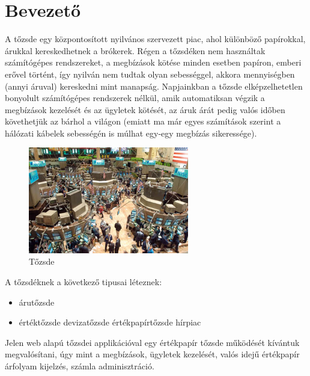 \chapter*{Bevezető}

A tőzsde egy központosított nyilvános szervezett piac, ahol különböző papírokkal, árukkal kereskedhetnek a brókerek. Régen a tőzsdéken nem használtak számítógépes rendszereket, a megbízások kötése minden esetben papíron, emberi erővel történt, így nyilván nem tudtak olyan sebességgel, akkora mennyiségben (annyi áruval) kereskedni mint manapság. Napjainkban a tőzsde elképzelhetetlen bonyolult számítógépes rendszerek nélkül, amik automatiksan végzik a megbízások kezelését és az ügyletek kötését, az áruk árát pedig valós időben követhetjük az bárhol a világon (emiatt ma már egyes számítások szerint a hálózati kábelek sebességén is múlhat egy-egy megbízás sikeressége).

\begin{figure}[!ht]
\centering
\includegraphics[width=70mm, keepaspectratio]{figures/tozsde.png}
\caption{Tőzsde}
\label{fig:kep_tozsde}
\end{figure}

A tőzsdéknek a következő tipusai léteznek:

\begin{itemize}
 \item árutőzsde
 \item értéktőzsde
 \subitem devizatőzsde
  \subitem értékpapírtőzsde
   \subitem hírpiac
\end{itemize}

Jelen web alapú tőzsdei applikációval egy értékpapír tőzsde működését kívántuk megvalósítani, úgy mint a megbízások, ügyletek kezelését, valós idejű értékpapír árfolyam kijelzés, számla adminisztráció.